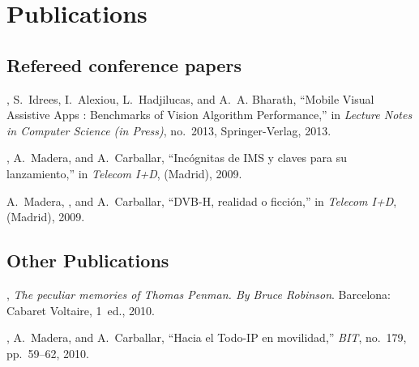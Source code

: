 
\section{Publications}

\subsection{Refereed conference papers}

\begin{thebibliography}{3}

, S.~Idrees, I.~Alexiou, L.~Hadjilucas, and A.~A. Bharath,
  ``{Mobile Visual Assistive Apps : Benchmarks of Vision Algorithm
  Performance},'' in {\em Lecture Notes in Computer Science (in Press)},
  no.~2013, Springer-Verlag, 2013.

, A.~Madera, and A.~Carballar, ``{Inc\'{o}gnitas de IMS y claves
  para su lanzamiento},'' in {\em Telecom I+D}, (Madrid), 2009.

A.~Madera, , and A.~Carballar, ``{DVB-H, realidad o
  ficci\'{o}n},'' in {\em Telecom I+D}, (Madrid), 2009.
  
\end{thebibliography}

\subsection{Other Publications}

\begin{thebibliography}{2}

, {\em {The peculiar memories of Thomas Penman.
  By Bruce Robinson}}.
\newblock Barcelona: Cabaret Voltaire, 1~ed., 2010.

, A.~Madera, and A.~Carballar, ``{Hacia el Todo-IP en
  movilidad},'' {\em BIT}, no.~179, pp.~59--62, 2010.

\end{thebibliography}
